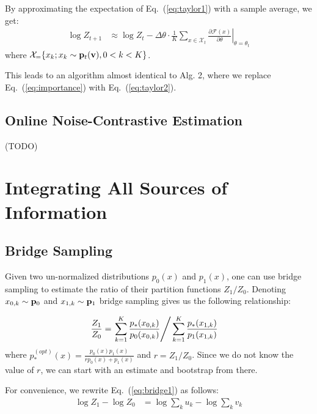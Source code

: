 \documentclass{article}
\begin{document}
By approximating the expectation of Eq.~(\ref{eq:taylor1}) with a sample average, we get:
\begin{align}
    \label{eq:taylor2}
    \log Z_{t+1} &\approx 
            \log Z_t -
            \Delta \theta \cdot \frac{1}{K}
            \sum_{x \in \mathcal{X}_t} \left. \frac {\partial \mathcal{F}(x)} {\partial \theta} \right|_{\theta=\theta_t}
\end{align}
where $\mathcal{X}_ = \{x_k; x_k \sim \mathbf{p}_t(\mathbf{v}), 0 < k < K \}$.
\bigskip


This leads to an algorithm almost identical to Alg. 2, where we replace
Eq.~(\ref{eq:importance}) with Eq.~(\ref{eq:taylor2}).

\subsection{Online Noise-Contrastive Estimation}
\label{sec:noise}

(TODO)

\section{Integrating All Sources of Information}
\label{sec:grid}
\def\dz{{\Delta \zeta}}

\subsection{Bridge Sampling}
\label{sec:bridge}

Given two un-normalized distributions $p_0(x)$ and $p_1(x)$, one can use
bridge sampling to estimate the ratio of their partition functions
$Z_1/Z_0$. Denoting $x_{0,k} \sim \mathbf{p}_0$ and $x_{1,k} \sim \mathbf{p}_1$ 
bridge sampling gives us the following relationship:

\begin{align}
    \label{eq:bridge1}
    \frac{Z_1}{Z_0} &= \left. \sum_{k=1}^K \frac{p_*(x_{0,k})}{p_0(x_{0,k})} 
                       \right/ \sum_{k=1}^K \frac{p_*(x_{1,k})}{p_1(x_{1,k})}
\end{align}
where $p_*^{(opt)}(x) = \frac{p_0(x) p_1(x)}{r p_0(x) + p_1(x)}$ and
$r=Z_1/Z_0$. Since we do not know the value of $r$, we can start with an
estimate and bootstrap from there.

\bigskip
For convenience, we rewrite Eq.~(\ref{eq:bridge1}) as follows:
\begin{align}
\log Z_1 - \log Z_0 &= \log \sum_k u_k - \log \sum_k v_k
\end{align}
\end{document}
